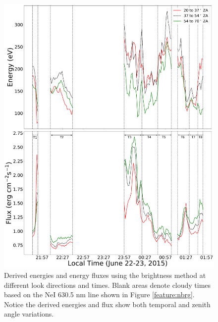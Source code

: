 \documentclass[crop=false,class=mitthesis,oneside,font=12pt]{standalone}
\begin{document}
\begin{figure}[H]
	\centering\includegraphics[width=30pc]{different_ld_m1_e_fl.pdf}
	\caption{Derived energies and energy fluxes using the brightness method at different look directions and times. Blank areas denote cloudy times based on the NeI 630.5 nm line shown in Figure \ref{feature:nbrg}. Notice the derived energies and flux show both temporal and zenith angle variations.}
	\label{fig:e_fl_la}
\end{figure}



\end{document}
